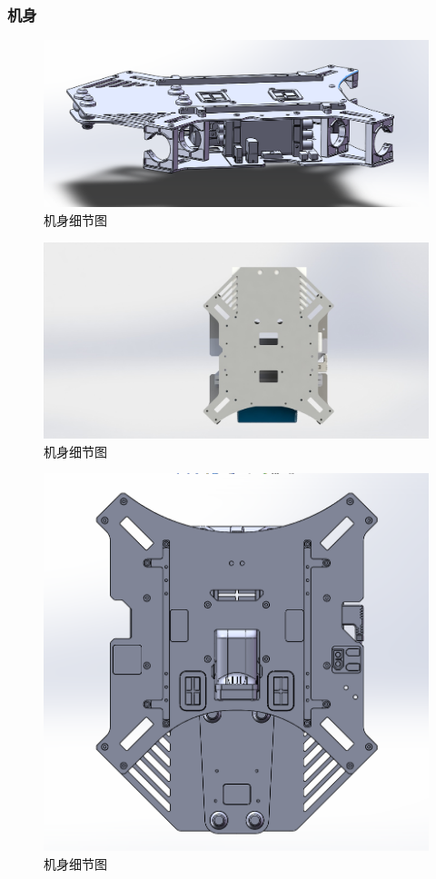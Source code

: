 \documentclass{ctexart}
\begin{document}
\subsubsection{机身}
\begin{figure}[H]
\centering
    \includegraphics[width = \textwidth]{013}
    \caption{机身细节图}\par
\end{figure}
\begin{figure}[H]
\centering
    \includegraphics[width = \textwidth]{014}
    \caption{机身细节图}\par
\end{figure}
\begin{figure}[H]
\centering
    \includegraphics[width = \textwidth]{015}
    \caption{机身细节图}\par
\end{figure}
\end{document}
